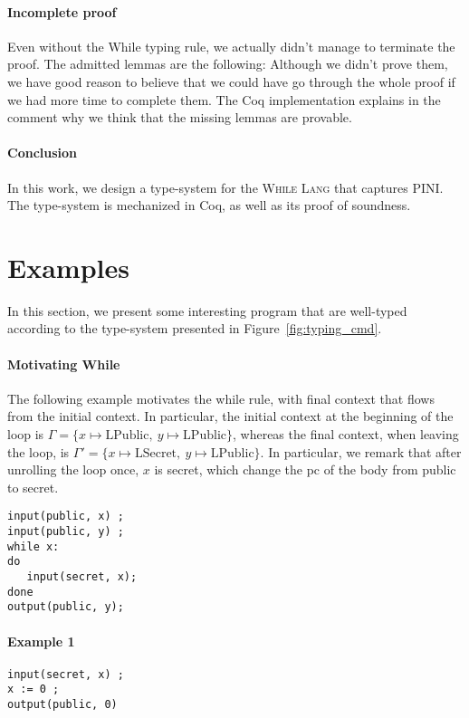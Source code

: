 \documentclass[10pt]{article}
\newcommand{\ctx}{\Gamma}
\newcommand{\public}{\mathrm{LPublic}}
\newcommand{\secret}{\mathrm{LSecret}}
\newcommand{\whilelang}{\textsc{While Lang} }
\begin{document}
\paragraph{Incomplete proof}
Even without the While typing rule, we actually didn't manage to terminate the proof.
The admitted lemmas are the following:
Although we didn't prove them, we have good reason to believe that we could have go through the
whole proof if we had more time to complete them. The Coq implementation explains in the comment why
we think that the missing lemmas are provable.

\paragraph{Conclusion}
In this work, we design a type-system for the \whilelang that captures PINI.
The type-system is mechanized in Coq, as well as its proof of soundness.

\appendix

\section{Examples}%
\label{sec:examples}

In this section, we present some interesting program that are well-typed according to the
type-system presented in Figure~\ref{fig:typing_cmd}.

\paragraph{Motivating While}
The following example motivates the while rule, with final context that flows from the initial
context. In particular, the initial context at the beginning of the loop is
$\ctx = \{ x \mapsto \public,\ y \mapsto \public \}$, whereas the final context, when leaving the
loop, is $\ctx' = \{ x \mapsto \secret,\ y \mapsto \public \}$. In particular, we remark that after
unrolling the loop once, $x$ is secret, which change the pc of the body from public to secret.
\begin{Verbatim}[samepage=true]
input(public, x) ;
input(public, y) ;
while x:
do
   input(secret, x);
done
output(public, y);
\end{Verbatim}

\paragraph{Example 1}
\begin{Verbatim}[samepage=true]
input(secret, x) ;
x := 0 ;
output(public, 0)
\end{Verbatim}
\end{document}
